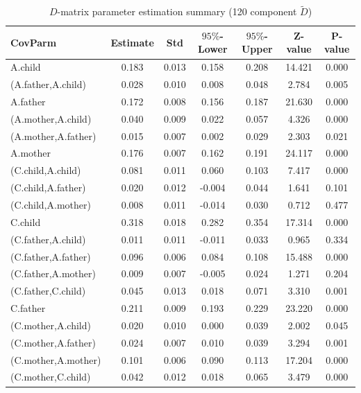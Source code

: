 \documentclass[11pt,a5paper,twoside]{book}
\begin{document}
{\scriptsize{
\begin{center}
\setlength\LTleft{0pt}
\setlength\LTright{0pt}
\begin{longtable}{@{\extracolsep{\fill}}lcccccc@{}}
\caption{$D$-matrix parameter estimation summary (120 component $\tilde{D}$)}
\label{d_est}
\endfirsthead
\endhead
  \hline \hline
CovParm & Estimate & Std & $95\%$-Lower & $95\%$-Upper & Z-value & P-value \\ 
  \hline

 A.child  & 0.183 & 0.013 & 0.158 & 0.208 & 14.421 & 0.000 \\ 
   (A.father,A.child)  & 0.028 & 0.010 & 0.008 & 0.048 & 2.784 & 0.005 \\ 
   A.father  & 0.172 & 0.008 & 0.156 & 0.187 & 21.630 & 0.000 \\ 
   (A.mother,A.child)  & 0.040 & 0.009 & 0.022 & 0.057 & 4.326 & 0.000 \\ 
   (A.mother,A.father)  & 0.015 & 0.007 & 0.002 & 0.029 & 2.303 & 0.021 \\ 
   A.mother  & 0.176 & 0.007 & 0.162 & 0.191 & 24.117 & 0.000 \\ 
   (C.child,A.child)  & 0.081 & 0.011 & 0.060 & 0.103 & 7.417 & 0.000 \\ 
   (C.child,A.father)  & 0.020 & 0.012 & -0.004 & 0.044 & 1.641 & 0.101 \\ 
   (C.child,A.mother)  & 0.008 & 0.011 & -0.014 & 0.030 & 0.712 & 0.477 \\ 
   C.child  & 0.318 & 0.018 & 0.282 & 0.354 & 17.314 & 0.000 \\ 
   (C.father,A.child)  & 0.011 & 0.011 & -0.011 & 0.033 & 0.965 & 0.334 \\ 
   (C.father,A.father)  & 0.096 & 0.006 & 0.084 & 0.108 & 15.488 & 0.000 \\ 
   (C.father,A.mother)  & 0.009 & 0.007 & -0.005 & 0.024 & 1.271 & 0.204 \\ 
   (C.father,C.child)  & 0.045 & 0.013 & 0.018 & 0.071 & 3.310 & 0.001 \\ 
   C.father  & 0.211 & 0.009 & 0.193 & 0.229 & 23.220 & 0.000 \\ 
   (C.mother,A.child)  & 0.020 & 0.010 & 0.000 & 0.039 & 2.002 & 0.045 \\ 
   (C.mother,A.father)  & 0.024 & 0.007 & 0.010 & 0.039 & 3.294 & 0.001 \\ 
   (C.mother,A.mother)  & 0.101 & 0.006 & 0.090 & 0.113 & 17.204 & 0.000 \\ 
   (C.mother,C.child)  & 0.042 & 0.012 & 0.018 & 0.065 & 3.479 & 0.000 \\ 

\end{longtable}
\end{center}}}
\end{document}
